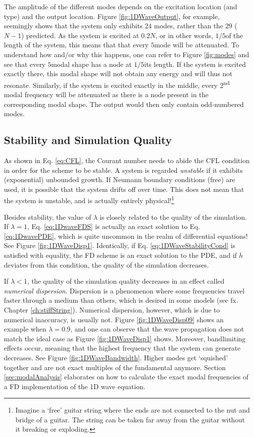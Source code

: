 The amplitude of the different modes depends on the excitation location (and type) and the output location. 
Figure \ref{fig:1DWaveOutput}, for example, seemingly shows that the system only exhibits $24$ modes, rather than the $29$ ($N-1$) predicted. As the system is excited at $0.2N$, or in other words, $1/5$\th of the length of the system, this means that that every $5$\th mode will be attenuated.
To understand how and/or why this happens, one can refer to Figure \ref{fig:modes} and see that every $5$\th modal shape has a node at $1/5$\th its length. If the system is excited exactly there, this modal shape will not obtain any energy and will thus not resonate. Similarly, if the system is excited exactly in the middle, every 2\textsuperscript{nd} modal frequency will be attenuated as there is a node present in the corresponding modal shape. The output would then only contain odd-numbered modes. 

\subsection{Stability and Simulation Quality}\label{sec:quality1DWave}
As shown in Eq. \eqref{eq:CFL}, the Courant number needs to abide the CFL condition in order for the scheme to be stable. A system is regarded \textit{unstable} if it exhibits (exponential) unbounded growth. If Neumann boundary conditions (free) are used, it is possible that the system drifts off over time. This does not mean that the system is unstable, and is actually entirely physical!\footnote{Imagine a `free' guitar string where the ends are not connected to the nut and bridge of a guitar. The string can be taken far away from the guitar without it breaking or exploding.}

Besides stability, the value of $\lambda$ is closely related to the quality of the simulation. 
If $\lambda = 1$, Eq. \eqref{eq:1DwaveFDS} is actually an exact solution to Eq. \eqref{eq:1DwavePDE}, which is quite uncommon in the realm of differential equations! See Figure \ref{fig:1DWaveDisp1}. Identically, if Eq. \eqref{eq:1DWaveStabilityCond} is satisfied with equality, the FD scheme is an exact solution to the PDE, and if $h$ deviates from this condition, the quality of the simulation decreases. 

If $\lambda < 1$, the quality of the simulation quality decreases in an effect called \textit{numerical dispersion}. Dispersion is a phenomenon where some frequencies travel faster through a medium than others, which is desired in some models (see fx. Chapter \ref{ch:stiffString}). Numerical dispersion, however, which is due to numerical inaccuracy, is usually not. Figure \ref{fig:1DWaveDisp09} shows an example when $\lambda = 0.9$, and one can observe that the wave propagation does not match the ideal case as Figure \ref{fig:1DWaveDisp1} shows. Moreover, bandlimiting effects occur, meaning that the highest frequency that the system can generate decreases. See Figure \ref{fig:1DWaveBandwidth}. Higher modes get `squished' together and are not exact multiples of the fundamental anymore. Section \ref{sec:modalAnalysis} elaborates on how to calculate the exact modal frequencies of a FD implementation of the 1D wave equation.

